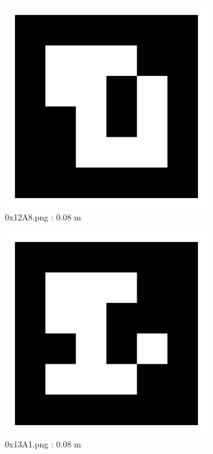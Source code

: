 \documentclass[11pt,a4,BCOR=0cm]{scrartcl}
\begin{document}
\begin{figure}
  \centering
    \includegraphics[width=8.955cm]{0x12A8.pdf}
    \caption{0x12A8.png : 0.08 m}
    \label{fig:0x12A8.pdf}
  
\end{figure} 

\clearpage

\begin{figure}
  \centering
    \includegraphics[width=8.955cm]{0x13A1.pdf}
    \caption{0x13A1.png : 0.08 m}
    \label{fig:0x13A1.pdf}
  
\end{figure} 
\end{document}
